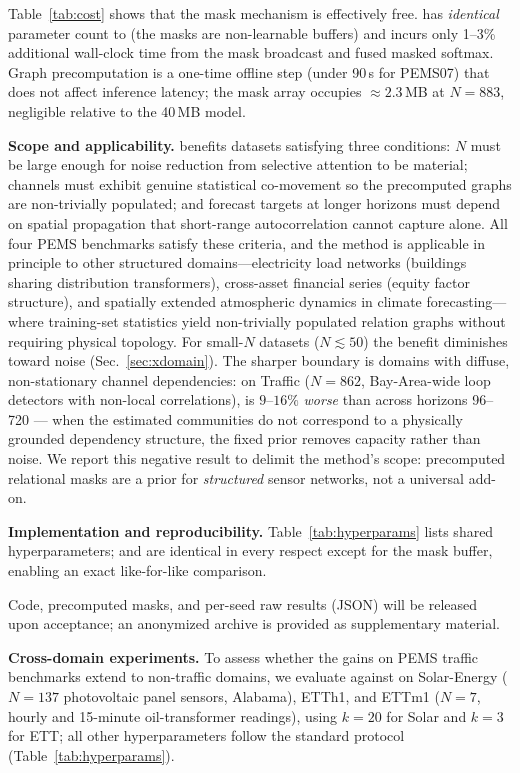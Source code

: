Table~\ref{tab:cost} shows that the mask mechanism is effectively free.
\mr{} has \emph{identical} parameter count to \itrans{} (the masks are
non-learnable buffers) and incurs only
1--3\% additional wall-clock time from the mask broadcast and fused masked softmax.
Graph precomputation is a one-time offline step (under 90\,s for PEMS07) that does
not affect inference latency; the mask array occupies $\approx2.3$\,MB at $N{=}883$,
negligible relative to the 40\,MB model.


\textbf{Scope and applicability.}
\label{sec:noharm}
\mr{} benefits datasets satisfying three conditions: $N$ must be large enough for
noise reduction from selective attention to be material; channels must exhibit genuine
statistical co-movement so the precomputed graphs are non-trivially populated; and
forecast targets at longer horizons must depend on spatial propagation that
short-range autocorrelation cannot capture alone.
All four PEMS benchmarks satisfy these criteria, and the method is applicable in
principle to other structured domains—electricity load networks (buildings sharing
distribution transformers), cross-asset financial series (equity factor structure), and
spatially extended atmospheric dynamics in climate forecasting—where training-set
statistics yield non-trivially populated relation graphs without requiring physical topology.
For small-$N$ datasets ($N\lesssim 50$) the benefit diminishes toward noise
(Sec.~\ref{sec:xdomain}). The sharper boundary is domains with diffuse,
non-stationary channel dependencies: on Traffic ($N{=}862$, Bay-Area-wide loop
detectors with non-local correlations), \mr{} is $9$--$16\%$ \emph{worse} than
\itrans{} across horizons 96--720 --- when the estimated communities do not
correspond to a physically grounded dependency structure, the fixed prior
removes capacity rather than noise. We report this negative result to
delimit the method's scope: precomputed relational masks are a prior for
\emph{structured} sensor networks, not a universal add-on.

\textbf{Implementation and reproducibility.}
\label{sec:repro}
Table~\ref{tab:hyperparams} lists shared hyperparameters; \mr{} and \itrans{} are
identical in every respect except for the mask buffer, enabling an exact like-for-like
comparison.


Code, precomputed masks, and per-seed raw results (JSON) will be released upon acceptance; an anonymized archive is provided as supplementary material.

\textbf{Cross-domain experiments.}
\label{sec:xdomain}
To assess whether the gains on PEMS traffic benchmarks extend to non-traffic domains,
we evaluate \mr{} against \itrans{} on Solar-Energy ($N{=}137$ photovoltaic panel
sensors, Alabama), ETTh1, and ETTm1 ($N{=}7$, hourly and 15-minute oil-transformer
readings), using $k{=}20$ for Solar and $k{=}3$ for ETT; all other hyperparameters
follow the standard protocol (Table~\ref{tab:hyperparams}).


